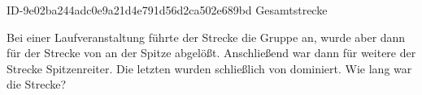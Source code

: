 \begin{exercise}
      {ID-9e02ba244adc0e9a21d4e791d56d2ca502e689bd}
      {Gesamtstrecke}
  \ifproblem\problem\par
    Bei einer Laufveranstaltung führte \xya{}  der Strecke die Gruppe
    an, wurde aber dann für  der Strecke von \xyb{} an der Spitze
    abgelößt. Anschließend war dann \xyc{} für weitere  der
    Strecke Spitzenreiter. Die letzten  wurden schließlich
    von \xyd{} dominiert. Wie lang war die Strecke?
  \fi
\end{exercise}
